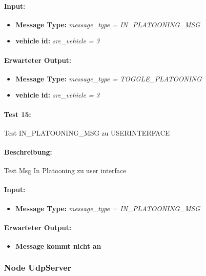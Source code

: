 \documentclass[a4paper, 12pt, titlepage]{scrartcl}
\begin{document}
{			\paragraph{Input:}
			\begin{itemize} \itemsep-0.5em
				\item \textbf{Message Type:} \emph{message\_type = IN\_PLATOONING\_MSG}
				\item \textbf{vehicle id:} \emph{src\_vehicle = 3}
			\end{itemize}
			\paragraph{Erwarteter Output:}
			\begin{itemize} \itemsep-0.5em
				\item \textbf{Message Type:} \emph{message\_type = TOGGLE\_PLATOONING}
				\item \textbf{vehicle id:} \emph{src\_vehicle = 3}
			\end{itemize}
			
			\paragraph{Test 15:}{Test IN\_PLATOONING\_MSG zu USERINTERFACE}
			\paragraph{Beschreibung:} Test Msg In Platooning zu user interface
			\paragraph{Input:}
			\begin{itemize} \itemsep-0.5em
				\item \textbf{Message Type:} \emph{message\_type = IN\_PLATOONING\_MSG}
			\end{itemize}
			\paragraph{Erwarteter Output:}
			\begin{itemize} \itemsep-0.5em
				\item \textbf{Message kommt nicht an}
			\end{itemize}
			
			\subsubsection{Node UdpServer}
			\label{node_upd_server}
}
\end{document}
